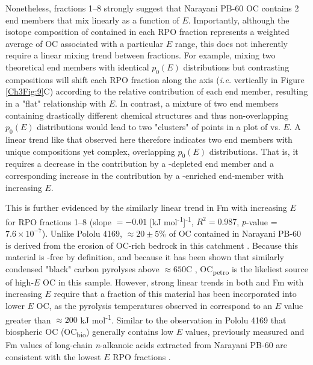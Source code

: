 Nonetheless, fractions 1--8 strongly suggest that Narayani PB-60 OC contains 2 end members that mix linearly as a function of $E$. Importantly, although the isotope composition of  contained in each RPO fraction represents a weighted average of OC associated with a particular $E$ range, this does not inherently require a linear mixing trend between fractions. For example, mixing two theoretical end members with identical $p_{0}(E)$ distributions but contrasting  compositions will shift each RPO fraction along the  axis (\textit{i.e.} vertically in Figure \ref{Ch3Fig:9}C) according to the relative contribution of each end member, resulting in a "flat"  relationship with $E$. In contrast, a mixture of two end members containing drastically different chemical structures and thus non-overlapping $p_{0}(E)$ distributions would lead to two "clusters" of points in a plot of  vs. $E$. A linear trend like that observed here therefore indicates two end members with unique  compositions yet complex, overlapping $p_{0}(E)$ distributions. That is, it requires a decrease in the contribution by a -depleted end member and a corresponding increase in the contribution by a -enriched end-member with increasing $E$. 

This is further evidenced by the similarly linear trend in Fm with increasing $E$ for RPO fractions 1--8 (slope $= -0.01$ [kJ mol\textsuperscript{-1}]\textsuperscript{-1}, $R^{2} = 0.987$, $p$-value = $7.6 \times 10^{-7}$). Unlike Pololu 4169, $\approx 20 \pm 5$\% of OC contained in Narayani PB-60 is derived from the erosion of OC-rich bedrock in this catchment \citep[OC\textsubscript{petro};][]{Galy:2008ff,Rosenheim:2012kh}. Because this material is -free by definition, and because it has been shown that similarly condensed "black" carbon pyrolyses above $\approx 650$\textdegree C \citep{Williams:2014bq}, OC\textsubscript{petro} is the likeliest source of high-$E$ OC in this sample. However, strong linear trends in both  and Fm with increasing $E$ require that a fraction of this material has been incorporated into lower $E$ OC, as the pyrolysis temperatures observed in \citet{Williams:2014bq} correspond to an $E$ value greater than $\approx 200$ kJ mol\textsuperscript{-1}. Similar to the observation in Pololu 4169 that biospheric OC (OC\textsubscript{bio}) generally contains low $E$ values, previously measured  and Fm values of long-chain \textit{n}-alkanoic acids extracted from Narayani PB-60 are consistent with the lowest $E$ RPO fractions \citep[Figure \ref{Ch3Fig:9}C--D;][]{Galy:2011hk,Galy:2011ix}. 

